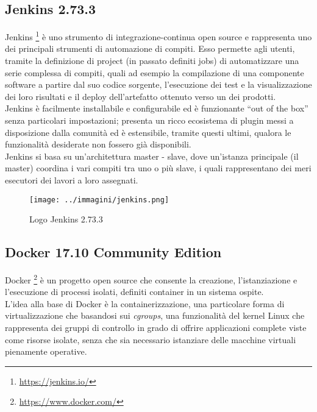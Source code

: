 \subsection{Jenkins 2.73.3}

Jenkins \footnote{\url{https://jenkins.io/}} è uno strumento di \gls{integrazione-continua} open source e rappresenta uno dei principali strumenti di automazione di compiti. Esso permette agli utenti, tramite la definizione di \gls{project} (in passato definiti jobs) di automatizzare una serie complessa di compiti, quali ad esempio la compilazione di una componente software a partire dal suo codice sorgente, l'esecuzione dei test e la visualizzazione dei loro risultati e il \gls{deploy} dell'\gls{artefatto} ottenuto verso un  dei prodotti.\\

Jenkins è facilmente installabile e configurabile ed è funzionante ``out of the box'' senza particolari impostazioni; presenta un ricco ecosistema di \gls{plugin} messi a disposizione dalla comunità ed è estensibile, tramite questi ultimi, qualora le funzionalità desiderate non fossero già disponibili.\\

Jenkins si basa su un'architettura \gls{master} - \gls{slave}, dove un'istanza principale (il \gls{master}) coordina i vari compiti tra uno o più \gls{slave}, i quali rappresentano dei meri esecutori dei lavori a loro assegnati.

\begin{figure}[H]
    \capstart
    \centering
    \texttt{[image: ../immagini/jenkins.png]}
    \caption{Logo Jenkins 2.73.3}
\end{figure}

\subsection{Docker 17.10 Community Edition}

Docker \footnote{\url{https://www.docker.com/}} è un progetto open source che consente la creazione, l'istanziazione e l'esecuzione di processi isolati, definiti \gls{container}\cite{site:what-is-a-container} in un sistema ospite. \\

L'idea alla base di Docker è la containerizzazione, una particolare forma di virtualizzazione che basandosi sui \textit{cgroups}, una funzionalità del kernel \gls{Linux} che rappresenta dei gruppi di controllo in grado di offrire applicazioni complete viste come risorse isolate, senza che sia necessario istanziare delle macchine virtuali pienamente operative. \\

